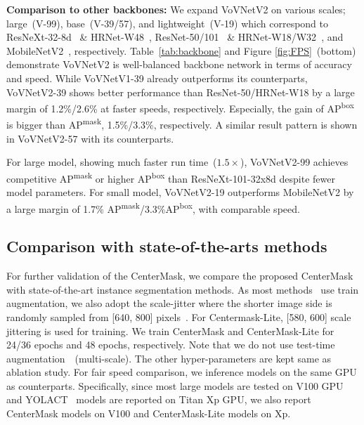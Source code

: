 \documentclass[10pt,twocolumn,letterpaper]{article}
\begin{document}
\noindent
\textbf{Comparison to other backbones:}
We expand VoVNetV2 on various scales; large~(V-99), base~(V-39/57), and lightweight~(V-19) which correspond to ResNeXt-32-8d~\cite{xie2017aggregated} \& HRNet-W48~\cite{sun2019high}, ResNet-50/101~\cite{he2016deep} \& HRNet-W18/W32~\cite{sun2019high}, and MobileNetV2~\cite{sandler2018mobilenetv2}, respectively.
Table~\ref{tab:backbone} and Figure \ref{fig:FPS}~(bottom) demonstrate VoVNetV2 is well-balanced backbone network in terms of accuracy and speed.
While VoVNetV1-39 already outperforms its counterparts, VoVNetV2-39 shows better performance than ResNet-50/HRNet-W18 by a large margin of 1.2\%/2.6\% at faster speeds, respectively.
Especially, the gain of AP\textsuperscript{box} is bigger than AP\textsuperscript{mask}, 1.5\%/3.3\%, respectively.
A similar result pattern is shown in VoVNetV2-57 with its counterparts.

For large model, showing much faster run time~($1.5\times$), VoVNetV2-99 achieves competitive AP\textsuperscript{mask} or higher AP\textsuperscript{box} than ResNeXt-101-32x8d despite fewer model parameters.
For small model, VoVNetV2-19 outperforms MobileNetV2 by a large margin of 1.7\% AP\textsuperscript{mask}/3.3\%AP\textsuperscript{box}, with comparable speed.






\subsection{Comparison with state-of-the-arts methods}\label{sec:SOTA}
For further validation of the CenterMask, we compare the proposed CenterMask with state-of-the-art instance segmentation methods.
As most methods~\cite{liu2016ssd,Chen_2019_ICCV,He_2019_ICCV,Bolya_2019_ICCV,fu2019retinamask} use train augmentation, we also adopt the scale-jitter where the shorter image side is randomly sampled from [640, 800] pixels~\cite{He_2019_ICCV}. For Centermask-Lite, [580, 600] scale jittering is used for training.
We train CenterMask and CenterMask-Lite for 24/36 epochs and 48 epochs, respectively.
Note that we do not use test-time augmentation~\cite{He_2019_ICCV}~(multi-scale).
The other hyper-parameters are kept same as ablation study.
For fair speed comparison, we inference models on the same GPU as counterparts.
Specifically, since most large models are tested on V100 GPU and YOLACT~\cite{Bolya_2019_ICCV} models are reported on Titan Xp GPU, we also report CenterMask models on V100 and CenterMask-Lite models on Xp.
\end{document}
